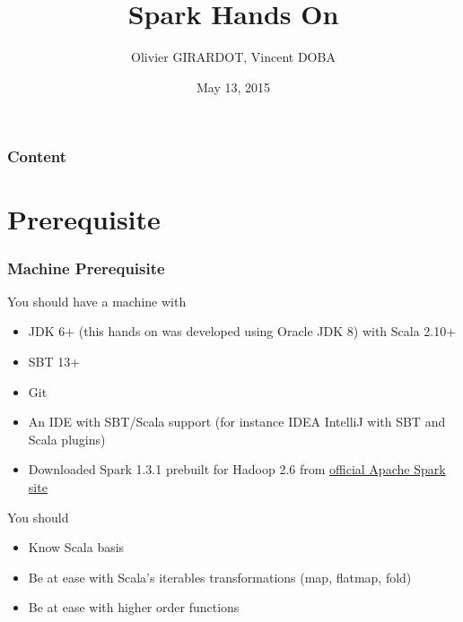 \documentclass[slidetop,9pt,utf8]{beamer}
\begin{document}
\begin{CJK}{UTF8}{gbsn}

\title{Spark Hands On}
\author{Olivier GIRARDOT, Vincent DOBA}
\date{May 13, 2015}

\frame{\titlepage}

\begin{frame}
  \frametitle{Content}
  \tableofcontents[hideallsubsections]
\end{frame}

\AtBeginSection{\frame{\sectionpage}}

\section{Prerequisite}

\begin{frame}
  \frametitle{Machine Prerequisite}

  \begin{block}{You should have a machine with}
    \begin{itemize}
      \item JDK 6+ (this hands on was developed using Oracle JDK 8) with Scala 2.10+
      \item SBT 13+
      \item Git
      \item An IDE with SBT/Scala support (for instance IDEA IntelliJ with SBT and Scala plugins)
      \item Downloaded Spark 1.3.1 prebuilt for Hadoop 2.6 from \href{http://www.apache.org/dyn/closer.cgi/spark/spark-1.3.1/spark-1.3.1-bin-hadoop2.6.tgz}{official Apache Spark site}
    \end{itemize}
  \end{block}

  \begin{block}{You should}
    \begin{itemize}
      \item Know Scala basis
      \item Be at ease with Scala's iterables transformations (map, flatmap, fold)
      \item Be at ease with higher order functions
    \end{itemize}
  \end{block}

\end{frame}


\end{CJK}
\end{document}
